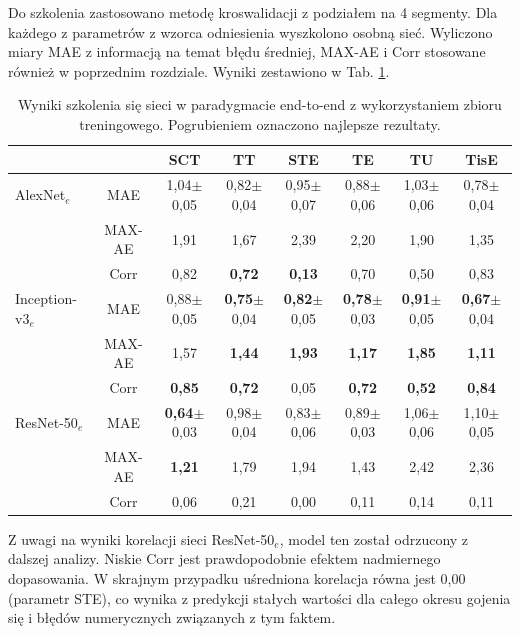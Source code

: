 Do szkolenia zastosowano metodę kroswalidacji z podziałem na 4 segmenty. Dla każdego z parametrów z wzorca odniesienia wyszkolono osobną sieć. Wyliczono miary MAE z informacją na temat błędu średniej, MAX-AE i Corr stosowane również w poprzednim rozdziale. Wyniki zestawiono w Tab. \ref{tab:end-to-endTrain}.
\vspace{10px}
\renewcommand{\arraystretch}{1.2}
\begin{table}[ht]
\scriptsize
\setlength{\tabcolsep}{1pt}
\centering
\caption{Wyniki szkolenia się sieci w paradygmacie end-to-end z wykorzystaniem zbioru treningowego. Pogrubieniem oznaczono najlepsze rezultaty.}
\label{tab:end-to-endTrain}
\begin{tabular}{lc||c|c|c|c|c|c}
	&& \textbf{SCT} & \textbf{TT} & \textbf{STE} & \textbf{TE} & \textbf{TU} & \textbf{TisE}\\ \hline \hline
	AlexNet$_{e}$ & MAE & 1,04$\pm$0,05 & 0,82$\pm$0,04 & 0,95$\pm$0,07 & 0,88$\pm$0,06 & 1,03$\pm$0,06 & 0,78$\pm$0,04  \\
	&MAX-AE & 1,91 & 1,67 & 2,39 & 2,20 & 1,90 & 1,35\\ 
	&Corr & 0,82 & \textbf{0,72} & \textbf{0,13} & 0,70 & 0,50 & 0,83 \\ \hline
	Inception-v3$_{e}$ & MAE & 0,88$\pm$0,05 & \textbf{0,75}$\pm$0,04 & \textbf{0,82}$\pm$0,05 & \textbf{0,78}$\pm$0,03 & \textbf{0,91}$\pm$0,05 & \textbf{0,67}$\pm$0,04 \\
	&MAX-AE & 1,57 & \textbf{1,44} & \textbf{1,93} & \textbf{1,17} & \textbf{1,85} & \textbf{1,11} \\ 
	&Corr & \textbf{0,85} & \textbf{0,72} & 0,05 & \textbf{0,72} & \textbf{0,52} & \textbf{0,84} \\ \hline
	ResNet-50$_{e}$ & MAE & \textbf{0,64}$\pm$0,03 & 0,98$\pm$0,04 & 0,83$\pm$0,06 & 0,89$\pm$0,03 & 1,06$\pm$0,06 & 1,10$\pm$0,05  \\
	&MAX-AE & \textbf{1,21} & 1,79 & 1,94 & 1,43 & 2,42 & 2,36\\
	&Corr & 0,06 & 0,21 & 0,00 & 0,11 & 0,14 & 0,11\\
	
	
\end{tabular}
\end{table}
\renewcommand{\arraystretch}{1}

Z uwagi na wyniki korelacji sieci ResNet-50$_{e}$, model ten został odrzucony z dalszej analizy. Niskie Corr jest prawdopodobnie efektem nadmiernego dopasowania. W skrajnym przypadku uśredniona korelacja równa jest 0,00 (parametr STE), co wynika z predykcji stałych wartości dla całego okresu gojenia się i błędów numerycznych związanych z tym faktem. 

